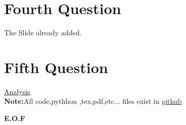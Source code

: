 \documentclass{article}
\begin{document}
\section*{Fourth Question}
The Slide already added.
\section*{Fifth Question}
\href{https://www.kaggle.com/dsoreo/home-depot-product-search-relevance/testing-r/comments }{Analysis}\\
\textbf{Note:}All code,pythhon ,tex,pdf,etc... files exist in \href{https://github.com/aqeel13932/DM/tree/master/HW11}{github}
\begin{center}
\textbf{E.O.F}
\end{center}
\end{document}
